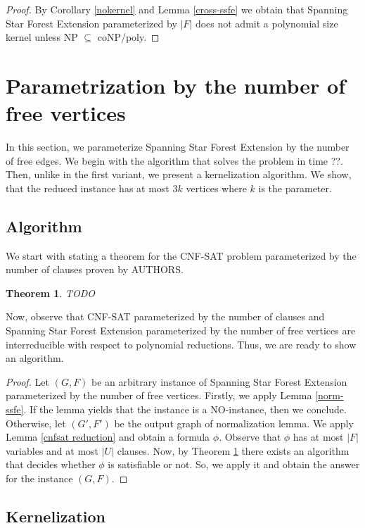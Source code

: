 \documentclass[en]{pracamgr}
\newtheorem{theorem}{Theorem}
\theoremstyle{definition}
\newcommand{\ssfep}{{\sc Spanning Star Forest Extension}}
\newcommand{\cnfsat}{{\sc CNF-SAT}}
\begin{document}
\thmssfepnokernel*

\begin{proof}
	By Corollary \ref{nokernel} and Lemma \ref{cross-ssfe} we obtain that \ssfep{} parameterized by $|F|$ does not admit a polynomial size kernel unless \textup{NP $\subseteq$ coNP/poly}.
\end{proof}

\section{Parametrization by the number of free vertices}

In this section, we parameterize  \ssfep{} by the number of free edges. We begin with the algorithm that solves the problem in time ??.%
Then, unlike in the first variant, we present a kernelization algorithm. We show, that the reduced instance has at most $3k$ vertices where $k$ is the parameter.

\subsection{Algorithm}
We start with stating a theorem for the \cnfsat{} problem parameterized by the number of clauses proven by AUTHORS. %

\begin{theorem}\label{cnfsatmtime}
	TODO
\end{theorem}

Now, observe that \cnfsat{} parameterized by the number of clauses and \ssfep{} parameterized by the number of free vertices are interreducible with respect to polynomial reductions. Thus, we are ready to show an algorithm.

\thmssfepfetime*

\begin{proof}
	Let $(G,F)$ be an arbitrary instance of \ssfep{} parameterized by the number of free vertices. Firstly, we apply Lemma \ref{norm-ssfe}. If the lemma yields that the instance is a NO-instance, then we conclude. Otherwise, let $(G',F')$ be the output graph of normalization lemma. We apply Lemma \ref{cnfsat reduction} and obtain a formula $\phi$. Observe that $\phi$ has at most $|F|$ variables and at most $|U|$ clauses. Now, by Theorem \ref{cnfsatmtime} there exists an algorithm that decides whether $\phi$ is satisfiable or not. So, we apply it and obtain the answer for the instance $(G,F)$.
\end{proof}

\subsection{Kernelization}
\end{document}
